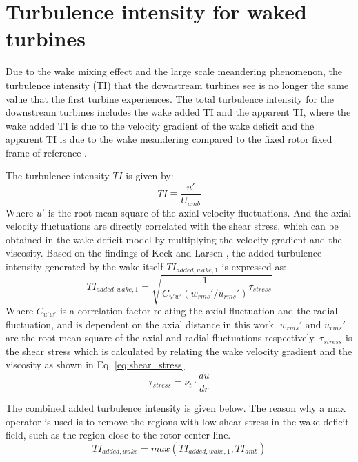 \documentclass{umthesis}
\begin{document}
\section{Turbulence intensity for waked turbines}\label{sec:waked_TI}
Due to the wake mixing effect and the large scale meandering phenomenon, the turbulence intensity (TI) that the downstream turbines see is no longer the same value that the first turbine experiences. The total turbulence intensity for the downstream turbines includes the wake added TI and the apparent TI, where the wake added TI is due to the velocity gradient of the wake deficit and the apparent TI is due to the wake meandering compared to the fixed rotor fixed frame of reference \cite{Keck_two}.

The turbulence intensity $TI$ is given by:
\begin{equation}
  TI\equiv \frac{u'}{U_{amb}}
\end{equation}
Where $u'$ is the root mean square of the axial velocity fluctuations. And the axial velocity fluctuations are directly correlated with the shear stress, which can be obtained in the wake deficit model by multiplying the velocity gradient and the viscosity. Based on the findings of Keck \cite{Keck_two} and Larsen \cite{Larsen_wake}, the added turbulence intensity generated by the wake itself $TI_{added,wake,1}$ is expressed as:
\begin{equation}
  TI_{added,wake,1}=\sqrt{\frac{1}{C_{u'w'}(w_{rms}'/u_{rms}')}\tau_{stress}}
\end{equation}
Where $C_{u'w'}$ is a correlation factor relating the axial fluctuation and the radial fluctuation, and is dependent on the axial distance in this work. $w_{rms}'$ and $u_{rms}'$ are the root mean square of the axial and radial fluctuations respectively. $\tau_{stress}$ is the shear stress which is calculated by relating the wake velocity gradient and the viscosity as shown in Eq. \ref{eq:shear_stress}.
\begin{equation} \label{eq:shear_stress}
  \tau_{stress}=\nu_t\cdot\frac{du}{dr}
\end{equation}


The combined added turbulence intensity is given below. The reason why a max operator is used is to remove the regions with low shear stress in the wake deficit field, such as the region close to the rotor center line.
\begin{equation} \label{eq:TI_added}
  TI_{added,wake}=max(TI_{added,wake,1},TI_{amb})
\end{equation}
\end{document}
